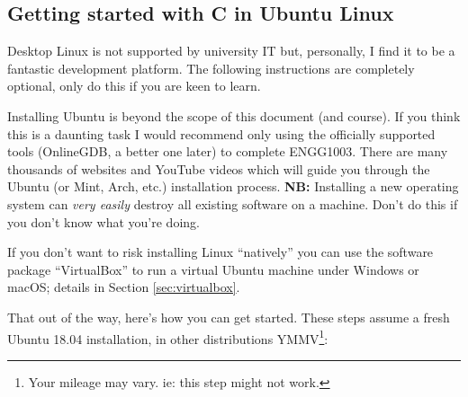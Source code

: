 \documentclass{lab}
\begin{document}
\pagebreak
\subsection{Getting started with C in Ubuntu Linux}

Desktop Linux is not supported by university IT but, personally, I find it to be a fantastic development platform. The following instructions are completely optional, only do this if you are keen to learn.

Installing Ubuntu is beyond the scope of this document (and course). If you think this is a daunting task I would recommend only using the officially supported tools (OnlineGDB, a better one later) to complete ENGG1003. There are many thousands of websites and YouTube videos which will guide you through the Ubuntu (or Mint, Arch, etc.) installation process. \textbf{NB:} Installing a new operating system can \textit{very easily} destroy all existing software on a machine. Don't do this if you don't know what you're doing.

If you don't want to risk installing Linux ``natively'' you can use the software package ``VirtualBox'' to run a virtual Ubuntu machine under Windows or macOS; details in Section \ref{sec:virtualbox}.

That out of the way, here's how you can get started. These steps assume a fresh Ubuntu 18.04 installation, in other distributions YMMV\footnote{Your mileage may vary. ie: this step might not work.}:
\end{document}
